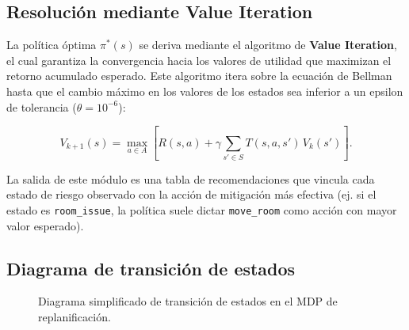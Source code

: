 \documentclass[12pt,twoside]{report}
\theoremstyle{definition}
\begin{document}
\subsection{Resoluci\'on mediante Value Iteration}

La pol\'itica \'optima $\pi^*(s)$ se deriva mediante el algoritmo de \textbf{Value Iteration}, el cual garantiza la convergencia hacia los valores de utilidad que maximizan el retorno acumulado esperado. Este algoritmo itera sobre la ecuaci\'on de Bellman hasta que el cambio m\'aximo en los valores de los estados sea inferior a un epsilon de tolerancia ($\theta = 10^{-6}$):

\begin{equation}
  V_{k+1}(s) = \max_{a \in A} \left[ R(s,a) + \gamma \sum_{s' \in S} T(s,a,s')\, V_k(s') \right].
  \label{eq:bellman2}
\end{equation}

La salida de este m\'odulo es una tabla de recomendaciones que vincula cada estado de riesgo observado con la acci\'on de mitigaci\'on m\'as efectiva (ej. si el estado es \texttt{room\_issue}, la pol\'itica suele dictar \texttt{move\_room} como acci\'on con mayor valor esperado).

\subsection{Diagrama de transici\'on de estados}

\begin{figure}[H]
\centering
{}
\caption{Diagrama simplificado de transici\'on de estados en el MDP de replanificaci\'on.}
\label{fig:mdp}
\end{figure}
\end{document}
